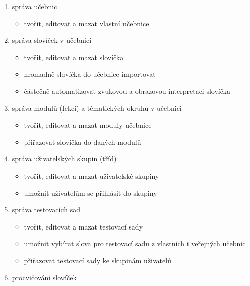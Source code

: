 \documentclass[a4paper,11pt,titlepage,fleqn]{article}
\begin{document}
        \begin{enumerate}
            \item správa učebnic
                \begin{itemize}
                    \item tvořit, editovat a mazat vlastní učebnice
                \end{itemize} 
            \item správa slovíček v učebnici
                \begin{itemize}
                    \item tvořit, editovat a mazat slovíčka
                    \item hromadně slovíčka do učebnice importovat
                    \item částečně automatizovat zvukovou a obrazovou interpretaci slovíčka
                \end{itemize} 
            \item správa modulů (lekcí) a tématických okruhů v učebnici
                \begin{itemize}
                    \item tvořit, editovat a mazat moduly učebnice
                    \item přiřazovat slovíčka do daných modulů
                \end{itemize}
            \item správa uživatelských skupin (tříd)
                \begin{itemize}
                    \item tvořit, editovat a mazat uživatelské skupiny
                    \item umožnit uživatelům se přihlásit do skupiny
                \end{itemize}
            \item správa testovacích sad
                \begin{itemize}
                    \item tvořit, editovat a mazat testovací sady
                    \item umožnit vybírat slova pro testovací sadu z vlastních i veřejných učebnic
                    \item přiřazovat testovací sady ke skupinám uživatelů
                \end{itemize}
            \item procvičování slovíček
                \begin{itemize}

\end{itemize}
\end{enumerate}
\end{document}
